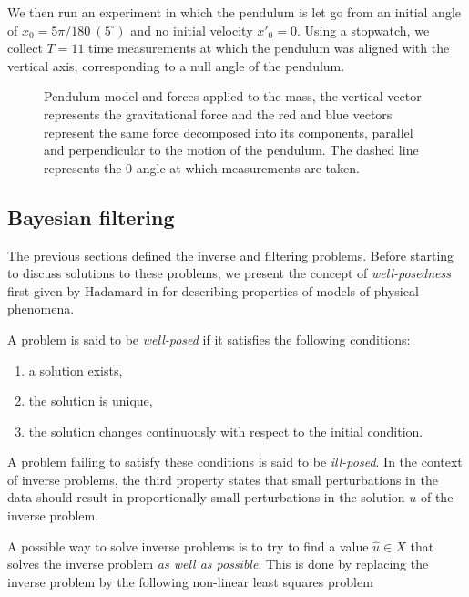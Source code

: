 We then run an experiment in which the pendulum is let go from an initial angle of $x_0 = 5\pi/180\ (5^\circ)$ and no initial velocity $x'_0 = 0$. Using a stopwatch, we collect $T=11$ time measurements at which the pendulum was aligned with the vertical axis, corresponding to a null angle of the pendulum.

\begin{figure}\label{pendulum-fig}
  \centering
  
  \caption{Pendulum model and forces applied to the mass, the vertical vector represents the gravitational force and the red and blue vectors represent the same force decomposed into its components, parallel and perpendicular to the motion of the pendulum. The dashed line represents the $0$ angle at which measurements are taken.}
\end{figure}

\subsection{Bayesian filtering}

The previous sections defined the inverse and filtering problems. Before starting to discuss solutions to these problems, we present the concept of \textit{well-posedness} first given by Hadamard in \cite{hadamard} for describing properties of models of physical phenomena.

\begin{definition} A problem is said to be \textit{well-posed} if it satisfies the following conditions:
  \begin{enumerate}
  \item{a solution exists,}
  \item{the solution is unique,}
  \item{the solution changes continuously with respect to the initial condition.}
  \end{enumerate}

  A problem failing to satisfy these conditions is said to be \textit{ill-posed}. In the context of inverse problems, the third property states that small perturbations in the data should result in proportionally small perturbations in the solution $u$ of the inverse problem.  
\end{definition}

A possible way to solve inverse problems is to try to find a value $\hat u \in X$ that solves the inverse problem \textit{as well as possible}. This is done by replacing the inverse problem by the following non-linear least squares problem

